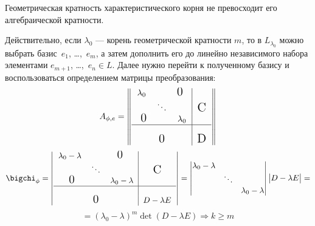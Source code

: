 \begin{thm}
Геометрическая кратность характеристического корня не превосходит его алгебраической кратности.
\end{thm}
Действительно, если $\lambda_0$ --- корень геометрической кратности $m$, то в $L_{\lambda_0}$ можно выбрать базис~$e_1$, \ldots,~$e_m$, а затем дополнить его до линейно независимого набора элементами $e_{m+1}$, \ldots,~$e_n \in L$. Далее нужно перейти к полученному базису и воспользоваться определением матрицы преобразования:
\begin{equation*}
A_{\phi,e}=
\begin{Vmatrix}
\begin{tabular}{ccc|c}
  $\lambda_0$ & 			&$\fudge{0 }$& \\
     			& $\ddots$ 	& 			& $\fudge C$ \\
  $\fudge{ 0}$&			& $\lambda_0$ & \\ \hline
     			&  			& 			& \\
     			& $\fudge 0$ 	& 			& $\fudge D$ \\
\end{tabular} 
\end{Vmatrix} 
\end{equation*}
\begin{equation*}
\bigchi_\phi=
\begin{vmatrix}
\begin{tabular}{ccc|c}
  $\lambda_0-\lambda$ & 			&$\fudge{0 }$ 			& \\
     			& $\ddots$ 	& 			& $\fudge C$ \\
  $\fudge{ 0}$&			& $\lambda_0-\lambda$ & \\ \hline
     			&  			& 			& \\
     			& $\fudge 0$ 	& 			& $ D-\lambda E$ \\
\end{tabular} 
\end{vmatrix} = \begin{vmatrix}
    \lambda_0-\lambda & 			& \\
     			& \ddots 	&  \\
     			&  & \lambda_0-\lambda\\ 
\end{vmatrix} \begin{vmatrix}
D-\lambda E
\end{vmatrix}=
\end{equation*}
\begin{equation}
=(\lambda_0-\lambda)^m \det(D-\lambda E) \Rightarrow k \ge m
\end{equation}
